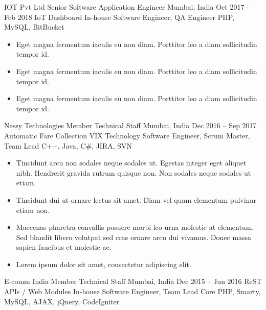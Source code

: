 \documentclass[10pt, a4paper]{cvhari}
\begin{document}
\smallskip
\divider
\smallskip


    \company
        {IOT Pvt Ltd}
        {Senior Software Application Engineer}
        {Mumbai, India}
        {Oct 2017 – Feb 2018}
        \project
        {IoT Dashboard}
        {In-house}
        {Software Engineer, QA Engineer}
        {PHP, MySQL, BitBucket}
        
        \begin{itemize}
            \item Eget magna fermentum iaculis eu non diam. Porttitor leo a diam sollicitudin tempor id. \smallskip
            \item Eget magna fermentum iaculis eu non diam. Porttitor leo a diam sollicitudin tempor id.\smallskip
            \item Eget magna fermentum iaculis eu non diam. Porttitor leo a diam sollicitudin tempor id.\smallskip
        \end{itemize}

\smallskip
\divider
\smallskip

    \company
        {Nessy Technologies}
        {Member Technical Staff}
        {Mumbai, India}
        {Dec 2016 – Sep 2017}
        \project
            {Automatic Fare Collection}
            {VIX Technology}
            {Software Engineer, Scrum Master, Team Lead}
            {C++, Java, C\#, JIRA, SVN}
        
        \begin{itemize}
            \item  Tincidunt arcu non sodales neque sodales ut. Egestas integer eget aliquet nibh. Hendrerit gravida rutrum quisque non. Non sodales neque sodales ut etiam. \smallskip
            \item  Tincidunt dui ut ornare lectus sit amet. Diam vel quam elementum pulvinar etiam non. \smallskip
            \item  Maecenas pharetra convallis posuere morbi leo urna molestie at elementum. Sed blandit libero volutpat sed cras ornare arcu dui vivamus. Donec massa sapien faucibus et molestie ac.\smallskip
            \item  Lorem ipsum dolor sit amet, consectetur adipiscing elit. \smallskip
        \end{itemize}

\smallskip
\divider
\smallskip

    \company
        {E-comm India}
        {Member Technical Staff}
        {Mumbai, India}
        {Dec 2015 – Jun 2016}
        \project
        {ReST APIs / Web Modules}
        {In-house}
        {Software Engineer, Team Lead}
        {Core PHP, Smarty, MySQL, AJAX, jQuery, CodeIgniter}
        
\end{document}
